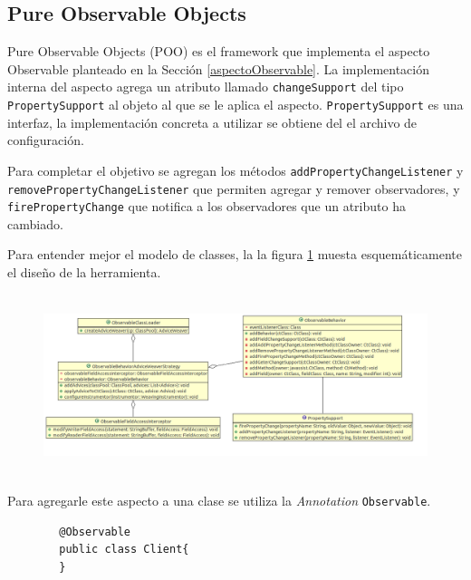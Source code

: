 \subsection{Pure Observable Objects}
	\label{poo}
	Pure Observable Objects (POO) es el framework que implementa el
	aspecto Observable planteado en la Sección \ref{aspectoObservable}.
	La implementación interna del aspecto agrega un
	atributo llamado \lstinline|changeSupport| del tipo
	\lstinline|PropertySupport| al objeto al que se le aplica el aspecto.
	\lstinline|PropertySupport| es una interfaz, la implementación concreta a
	utilizar se obtiene del el archivo de configuración.
	
	Para completar el objetivo se agregan los métodos 
	\lstinline|addPropertyChangeListener| y
	\lstinline|removePropertyChangeListener| que permiten agregar 
	y remover observadores, y \lstinline|firePropertyChange|
	que notifica a los observadores que un atributo ha cambiado.
	
	Para entender mejor el modelo de classes, la la figura \ref{fig:poo} muesta
	esquemáticamente el diseño de la herramienta.
	
	\begin{figure}
		\includegraphics[width=450px, height=200px]{img/poo}
	 	\label{fig:poo}
	 	\caption{}
	\end{figure}
	
	Para agregarle este aspecto a una clase se utiliza la \emph{Annotation}
	\lstinline|Observable|.
	
	\begin{lstlisting} 
		@Observable
		public class Client{
		}
	\end{lstlisting}
